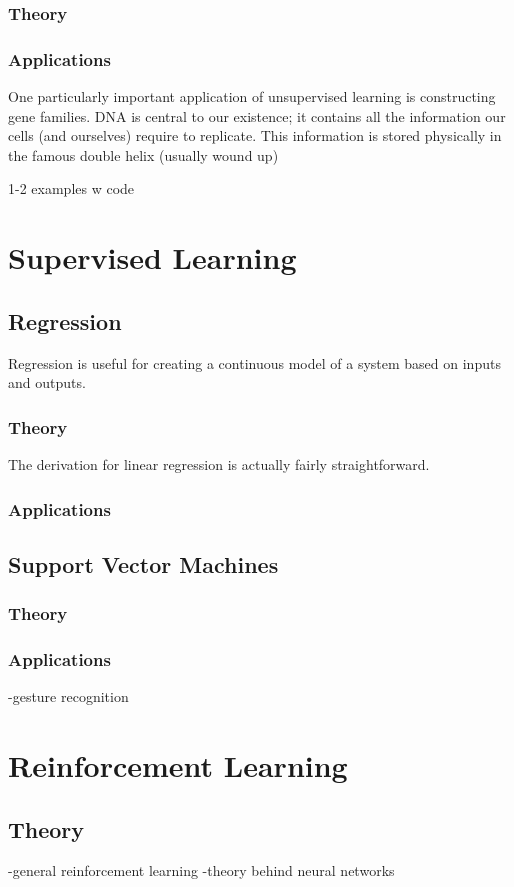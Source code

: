 \documentclass[11pt]{article}
\begin{document}
\subsubsection{Theory}
\subsubsection{Applications}
One particularly important application of unsupervised learning is constructing gene families. DNA is central to our existence; it contains all the information our cells (and ourselves) require to replicate. This information is stored physically in the famous double helix (usually wound up)

1-2 examples w code

\section{Supervised Learning}
\subsection{Regression}
Regression is useful for creating a continuous model of a system based on inputs and outputs.
\subsubsection{Theory}
The derivation for linear regression is actually fairly straightforward.
\subsubsection{Applications}

\subsection{Support Vector Machines}
\subsubsection{Theory}
\subsubsection{Applications}
-gesture recognition

\section{Reinforcement Learning}
\subsection{Theory}
-general reinforcement learning
-theory behind neural networks
\end{document}

